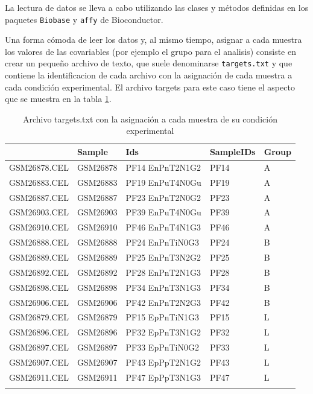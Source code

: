 \documentclass[a4paper]{article}\usepackage[]{graphicx}\usepackage[]{color}
\makeatletter
\newenvironment{kframe}{%
 \def\at@end@of@kframe{}%
 \ifinner\ifhmode%
  \def\at@end@of@kframe{\end{minipage}}%
  \begin{minipage}{\columnwidth}%
 \fi\fi%
 \def\FrameCommand##1{\hskip\@totalleftmargin \hskip-\fboxsep
 \colorbox{shadecolor}{##1}\hskip-\fboxsep
     \hskip-\linewidth \hskip-\@totalleftmargin \hskip\columnwidth}%
 \MakeFramed {\advance\hsize-\width
   \@totalleftmargin\z@ \linewidth\hsize
   \@setminipage}}%
 {\par\unskip\endMakeFramed%
 \at@end@of@kframe}
\newcommand{\Rcode}[1]{{\texttt{#1}}}
\makeatother
\begin{document}
La lectura de datos se lleva a cabo utilizando las clases y métodos definidas en los paquetes \Rcode{Biobase} y \Rcode{affy} de Bioconductor.

Una forma cómoda de leer los datos y, al mismo tiempo, asignar a cada muestra los valores de las covariables (por ejemplo el grupo para el analisis) consiste en crear un pequeño archivo de texto, que suele denominarse \Rcode{targets.txt} y que contiene la identificacion de cada archivo con la asignación de cada muestra a cada condición experimental. El archivo targets para este caso tiene el aspecto que se muestra en la tabla \ref{table.targets}.

\begin{kframe}


{\ttfamily\noindent\itshape\color{messagecolor}{\#\# Loading required package: xtable}}\end{kframe}%
\begin{longtable}{rllll}
  \hline
 & Sample & Ids & SampleIDs & Group \\ 
  \hline
GSM26878.CEL & GSM26878 & PF14 EnPnT2N1G2 & PF14 & A \\ 
  GSM26883.CEL & GSM26883 & PF19 EnPuT4N0Gu & PF19 & A \\ 
  GSM26887.CEL & GSM26887 & PF23 EnPnT2N0G2 & PF23 & A \\ 
  GSM26903.CEL & GSM26903 & PF39 EnPuT4N0Gu & PF39 & A \\ 
  GSM26910.CEL & GSM26910 & PF46 EnPnT4N1G3 & PF46 & A \\ 
  GSM26888.CEL & GSM26888 & PF24 EnPnTiN0G3 & PF24 & B \\ 
  GSM26889.CEL & GSM26889 & PF25 EnPnT3N2G2 & PF25 & B \\ 
  GSM26892.CEL & GSM26892 & PF28 EnPnT2N1G3 & PF28 & B \\ 
  GSM26898.CEL & GSM26898 & PF34 EnPnT3N1G3 & PF34 & B \\ 
  GSM26906.CEL & GSM26906 & PF42 EnPnT2N2G3 & PF42 & B \\ 
  GSM26879.CEL & GSM26879 & PF15 EpPnTiN1G3 & PF15 & L \\ 
  GSM26896.CEL & GSM26896 & PF32 EpPnT3N1G2 & PF32 & L \\ 
  GSM26897.CEL & GSM26897 & PF33 EpPnTiN0G2 & PF33 & L \\ 
  GSM26907.CEL & GSM26907 & PF43 EpPpT2N1G2 & PF43 & L \\ 
  GSM26911.CEL & GSM26911 & PF47 EpPpT3N1G3 & PF47 & L \\ 
   \hline
\hline
\caption{Archivo targets.txt con la asignación a cada muestra de su condición experimental} 
\label{table.targets}
\end{longtable}
\end{document}
